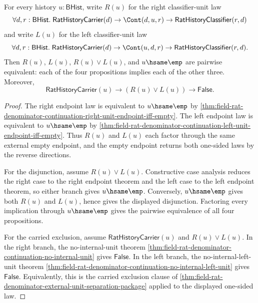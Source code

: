 \begin{theorem}
\label{thm:field-rat-denominator-external-unit-normal-form}
For every history $u:\mathsf{BHist}$, write $R(u)$ for the right
classifier-unit law
$$
\forall d,r:\mathsf{BHist}.\;
\mathsf{RatHistoryCarrier}(d)\to
\Cont(d,u,r)\to
\mathsf{RatHistoryClassifier}(r,d)
$$
and write $L(u)$ for the left classifier-unit law
$$
\forall d,r:\mathsf{BHist}.\;
\mathsf{RatHistoryCarrier}(d)\to
\Cont(u,d,r)\to
\mathsf{RatHistoryClassifier}(r,d).
$$
Then $R(u)$, $L(u)$, $R(u)\lor L(u)$, and $u\hsame\emp$ are pairwise
equivalent: each of the four propositions implies each of the other three.
Moreover,
$$
\mathsf{RatHistoryCarrier}(u)\to (R(u)\lor L(u))\to \mathsf{False}.
$$
\end{theorem}
\begin{proof}
The right endpoint law is equivalent to $u\hsame\emp$ by
\autoref{thm:field-rat-denominator-continuation-right-unit-endpoint-iff-empty}.
The left endpoint law is equivalent to $u\hsame\emp$ by
\autoref{thm:field-rat-denominator-continuation-left-unit-endpoint-iff-empty}.
Thus $R(u)$ and $L(u)$ each factor through the same external empty endpoint,
and the empty endpoint returns both one-sided laws by the reverse directions.

For the disjunction, assume $R(u)\lor L(u)$. Constructive case analysis
reduces the right case to the right endpoint theorem and the left case to the
left endpoint theorem, so either branch gives $u\hsame\emp$. Conversely,
$u\hsame\emp$ gives both $R(u)$ and $L(u)$, hence gives the displayed
disjunction. Factoring every implication through $u\hsame\emp$ gives the
pairwise equivalence of all four propositions.

For the carried exclusion, assume $\mathsf{RatHistoryCarrier}(u)$ and
$R(u)\lor L(u)$. In the right branch, the no-internal-unit theorem
\autoref{thm:field-rat-denominator-continuation-no-internal-unit} gives
$\mathsf{False}$. In the left branch, the no-internal-left-unit theorem
\autoref{thm:field-rat-denominator-continuation-no-internal-left-unit} gives
$\mathsf{False}$. Equivalently, this is the carried exclusion clause of
\autoref{thm:field-rat-denominator-external-unit-separation-package} applied
to the displayed one-sided law.
\end{proof}

